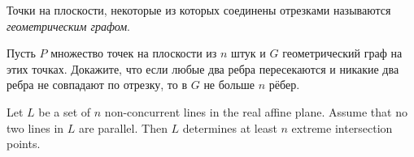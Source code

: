 \documentclass[14pt,DIV14]{scrartcl}
\begin{document}
\begin{definition}
Точки на плоскости, некоторые из которых соединены отрезками называются  \emph{геометрическим графом}.
\end{definition}
\begin{task}
Пусть $P$ множество точек на плоскости из $n$ штук и $G$ геометрический граф на этих точках. Докажите, что если любые два ребра пересекаются и никакие два  ребра не совпадают по отрезку, то в $G$ не больше $n$ рёбер.
\end{task}
\begin{task}
Let $L$ be a set of $n$ non-concurrent lines in the real affine plane. Assume
that no two lines in $L$ are parallel. Then $L$ determines at least $n$ extreme intersection points.
\end{task}
\end{document}
